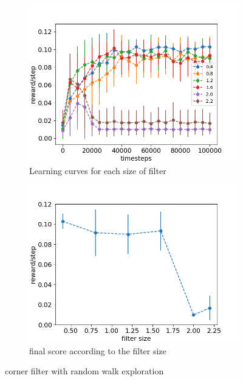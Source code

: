 \documentclass{article}
\begin{document}
\begin{figure}[H]
  \centering
   \begin{subfigure}[b]{0.4\linewidth}
    \includegraphics[width=\linewidth]{Study_2/2.4/visualizations/scores_filter_size.png}
      \caption{Learning curves for each size of filter}
  \end{subfigure}
  \begin{subfigure}[b]{0.4\linewidth}
    \includegraphics[width=\linewidth]{Study_2/2.4/visualizations/total_scores.png}
    \caption{final score according to the filter size}
  \end{subfigure}
   \caption{corner filter with random walk exploration}
    \label{fig:corner_curves_random_walk}
\end{figure}
\end{document}

